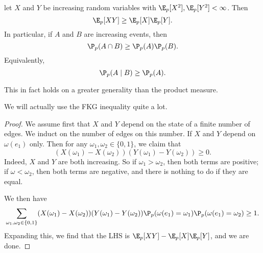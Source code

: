 \documentclass[a4paper]{article}
\begin{document}
\begin{thm} %
  let $X$ and $Y$ be increasing random variables with $\E_p[X^2], \E_p[Y^2] < \infty$. Then
  \[
    \E_p[XY] \geq \E_p[X] \E_p[Y].
  \]
  In particular, if $A$ and $B$ are increasing events, then
  \[
    \P_p(A \cap B) \geq \P_p(A) \P_p(B).
  \]
  Equivalently,
  \[
    \P_p(A \mid B) \geq \P_p(A).
  \]
\end{thm}
This in fact holds on a greater generality than the product measure.

We will actually use the FKG inequality quite a lot.
\begin{proof}
  We assume first that $X$ and $Y$ depend on the state of a finite number of edges. We induct on the number of edges on this number. If $X$ and $Y$ depend on $\omega(e_1)$ only. Then for any $\omega_1, \omega_2 \in \{0, 1\}$, we claim that
  \[
    (X(\omega_1) - X(\omega_2))(Y(\omega_1) - Y(\omega_2)) \geq 0.
  \]
  Indeed, $X$ and $Y$ are both increasing. So if $\omega_1 > \omega_2$, then both terms are positive; if $\omega < \omega_2$, then both terms are negative, and there is nothing to do if they are equal.

  We then have
  \[
    \sum_{\omega_1, \omega_2 \in \{0, 1\}} (X(\omega_1) - X(\omega_2)) (Y(\omega_1) - Y(\omega_2)) \P_p( \omega(e_1) = \omega_1) \P_p(\omega(e_1) = \omega_2) \geq 1.
  \]
  Expanding this, we find that the LHS is $\E_p[XY] - \E_p[X] \E_p[Y]$, and we are done.


\end{proof}
\end{document}
